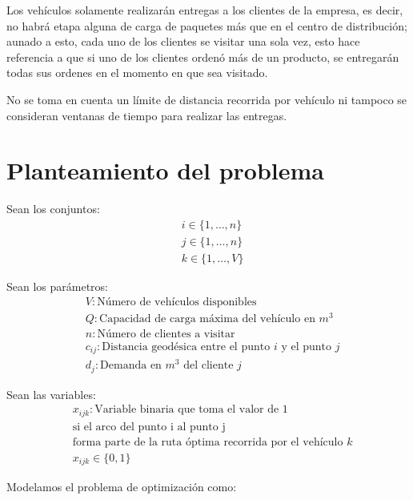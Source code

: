 \documentclass[journal]{IEEEtran}
\begin{document}
        Los vehículos solamente realizarán entregas a los clientes de la empresa, es decir, no habrá etapa alguna de carga de paquetes más que en el centro de distribución; aunado a esto, cada uno de los clientes se visitar una sola vez, esto hace referencia a que si uno de los clientes ordenó más de un producto, se entregarán todas sus ordenes en el momento en que sea visitado.
        
        No se toma en cuenta un límite de distancia recorrida por vehículo ni tampoco se consideran ventanas de tiempo para realizar las entregas.
    
    \section{Planteamiento del problema} \label{sec:problem}

        Sean los conjuntos:
        \begin{align*}
            & i \in \{1, \dots, n \} \\
            & j \in \{1, \dots, n \} \\
            & k \in \{1, \dots, V \}
        \end{align*}
        
        Sean los parámetros:
        \begin{align*}
            & V: \text{Número de vehículos disponibles} \\
            & Q: \text{Capacidad de carga máxima del vehículo en } m^3 \\
            & n: \text{Número de clientes a visitar} \\
            & c_{ij}: \text{Distancia geodésica entre el punto } i \text{ y el punto } j \\
            & d_j: \text{Demanda en } m^3 \text{ del cliente } j 
        \end{align*}
        
        Sean las variables:
        \begin{align*}
            & x_{ijk}: \text{Variable binaria que toma el valor de 1}\\
            & \text{si el arco del punto i al punto j} \\
            & \text{forma parte de la ruta óptima recorrida por el vehículo } k \\
            & x_{ijk} \in \{0, 1\}
        \end{align*}
        
        Modelamos el problema de optimización como:
        
\end{document}
